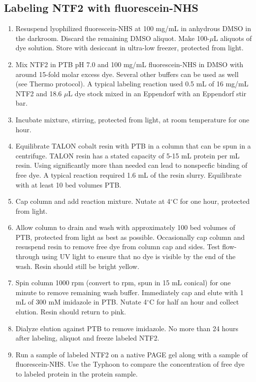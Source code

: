 \subsection{Labeling NTF2 with fluorescein-NHS}
\begin{enumerate}
\item Resuspend lyophilized fluorescein-NHS at 100 mg/mL in anhydrous DMSO in the darkroom.  Discard the remaining DMSO aliquot.  Make 100-$\mu$L aliquots of dye solution. Store with desiccant in ultra-low freezer, protected from light.
\item Mix NTF2 in PTB pH 7.0 and 100 mg/mL fluorescein-NHS in DMSO with around 15-fold molar excess dye.  Several other buffers can be used as well (see Thermo protocol).  A typical labeling reaction used 0.5 mL of 16 mg/mL NTF2 and 18.6 $\mu$L dye stock mixed in an Eppendorf with an Eppendorf stir bar.
\item Incubate mixture, stirring, protected from light, at room temperature for one hour.
\item Equilibrate TALON cobalt resin with PTB in a column that can be spun in a centrifuge.  TALON resin has a stated capacity of 5-15 mL protein per mL resin.  Using significantly more than needed can lead to nonspecfic binding of free dye.  A typical reaction required 1.6 mL of the resin slurry.  Equilibrate with at least 10 bed volumes PTB.
\item Cap column and add reaction mixture.  Nutate at 4$^\circ$C for one hour, protected from light.
\item Allow column to drain and wash with approximately 100 bed volumes of PTB, protected from light as best as possible.  Occasionally cap column and resuspend resin to remove free dye from column cap and sides.  Test flow-through using UV light to ensure that no dye is visible by the end of the wash.  Resin should still be bright yellow.
\item Spin column 1000 rpm (convert to rpm, spun in 15 mL conical) for one minute to remove remaining wash buffer.  Immediately cap and elute with 1 mL of 300 mM imidazole in PTB.  Nutate 4$^\circ$C for half an hour and collect elution.  Resin should return to pink.
\item Dialyze elution against PTB to remove imidazole.  No more than 24 hours after labeling, aliquot and freeze labeled NTF2.
\item Run a sample of labeled NTF2 on a native PAGE gel along with a sample of fluorescein-NHS.  Use the Typhoon to compare the concentration of free dye to labeled protein in the protein sample.
\end{enumerate}
